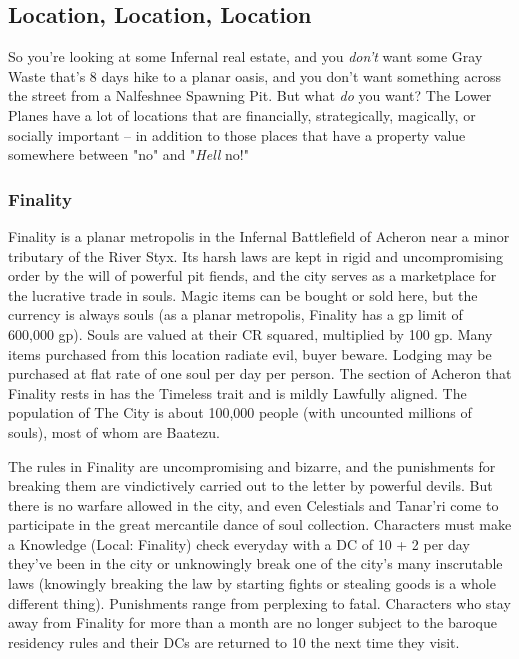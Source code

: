 \subsection{Location, Location, Location}

So you're looking at some Infernal real estate, and you \textit{don't} want some Gray Waste that's 8 days hike to a planar oasis, and you don't want something across the street from a Nalfeshnee Spawning Pit. But what \textit{do} you want? The Lower Planes have a lot of locations that are financially, strategically, magically, or socially important -- in addition to those places that have a property value somewhere between "no" and "\textit{Hell} no!"

\subsubsection{Finality}

Finality is a planar metropolis in the Infernal Battlefield of Acheron near a minor tributary of the River Styx. Its harsh laws are kept in rigid and uncompromising order by the will of powerful pit fiends, and the city serves as a marketplace for the lucrative trade in souls. Magic items can be bought or sold here, but the currency is always souls (as a planar metropolis, Finality has a gp limit of 600,000 gp). Souls are valued at their CR squared, multiplied by 100 gp. Many items purchased from this location radiate evil, buyer beware. Lodging may be purchased at flat rate of one soul per day per person. The section of Acheron that Finality rests in has the Timeless trait and is mildly Lawfully aligned. The population of The City is about 100,000 people (with uncounted millions of souls), most of whom are Baatezu.

The rules in Finality are uncompromising and bizarre, and the punishments for breaking them are vindictively carried out to the letter by powerful devils. But there is no warfare allowed in the city, and even Celestials and Tanar'ri come to participate in the great mercantile dance of soul collection. Characters must make a Knowledge (Local: Finality) check everyday with a DC of 10 + 2 per day they've been in the city or unknowingly break one of the city's many inscrutable laws (knowingly breaking the law by starting fights or stealing goods is a whole different thing). Punishments range from perplexing to fatal. Characters who stay away from Finality for more than a month are no longer subject to the baroque residency rules and their DCs are returned to 10 the next time they visit.

